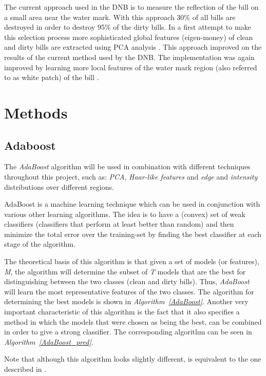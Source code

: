 \documentclass[11pt,twocolumn]{article}
\begin{document}
		The current approach used in the DNB is to measure the reflection of the bill on a small area near the water mark. With this approach 30\% of all bills are destroyed in order to destroy 95\% of the dirty bills. In a first attempt to make this selection process more		sophisticated global features (eigen-money) of clean and dirty bills are extracted using PCA analysis \cite{MoNuSt}. This approach improved on the results of the current method used by the DNB. The implementation was again improved by learning more local features of the water mark region (also referred to as white patch) of the bill \cite{Geusebroek}. 
	\section{Methods}\label{sec:Methods}
		\subsection{Adaboost}\label{sec:Adaboost}
			The \emph{AdaBoost} algorithm will be used in combination with different techniques throughout this project, such as: \emph{PCA}, \emph{Haar-like features} and \emph{edge} and \emph{intensity} distributions over different regions.

AdaBoost is a machine learning technique which can be used in conjunction with various other learning algorithms. The idea is to have a (convex) set of weak classifiers (classifiers that perform at least better than random) and then minimize the total error over the training-set by finding the best classifier at each stage of the algorithm.

The theoretical basis of this algorithm is that given a set of models (or features), \emph{M}, the algorithm will determine the subset of \emph{T} models that	 are the best for distinguishing between the two classes (clean and dirty bills). Thus, \emph{AdaBoost} will learn the most representative features of the two classes. The algorithm for determining the best models is shown in \emph{Algorithm~\ref{AdaBoost}}. Another very important characteristic of this algorithm is the fact that it also specifies a method in which the models that were chosen as being the best, can be combined in order to give a strong classifier. The corresponding algorithm can be seen in \emph{Algorithm~\ref{AdaBoost_pred}}.

Note that although this algorithm looks slightly different, is equivalent to the one described in \cite{Haar}.
			
\end{document}
